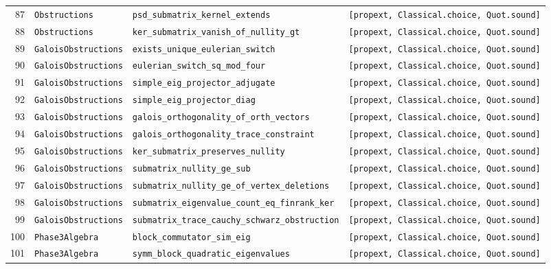 \documentclass[11pt,reqno]{amsart}
\theoremstyle{definition}
\theoremstyle{remark}
\numberwithin{equation}{section}
\numberwithin{table}{section}
\begin{document}
{\begin{longtable}{@{}r>{\raggedright\arraybackslash}p{1.2in}>{\raggedright\arraybackslash}p{2.55in}>{\raggedright\arraybackslash}p{1.85in}@{}}
87 & \nolinkurl{Obstructions} & \nolinkurl{psd_submatrix_kernel_extends} & \texttt{[propext, Classical.choice, Quot.sound]} \\
88 & \nolinkurl{Obstructions} & \nolinkurl{ker_submatrix_vanish_of_nullity_gt} & \texttt{[propext, Classical.choice, Quot.sound]} \\
89 & \nolinkurl{GaloisObstructions} & \nolinkurl{exists_unique_eulerian_switch} & \texttt{[propext, Classical.choice, Quot.sound]} \\
90 & \nolinkurl{GaloisObstructions} & \nolinkurl{eulerian_switch_sq_mod_four} & \texttt{[propext, Classical.choice, Quot.sound]} \\
91 & \nolinkurl{GaloisObstructions} & \nolinkurl{simple_eig_projector_adjugate} & \texttt{[propext, Classical.choice, Quot.sound]} \\
92 & \nolinkurl{GaloisObstructions} & \nolinkurl{simple_eig_projector_diag} & \texttt{[propext, Classical.choice, Quot.sound]} \\
93 & \nolinkurl{GaloisObstructions} & \nolinkurl{galois_orthogonality_of_orth_vectors} & \texttt{[propext, Classical.choice, Quot.sound]} \\
94 & \nolinkurl{GaloisObstructions} & \nolinkurl{galois_orthogonality_trace_constraint} & \texttt{[propext, Classical.choice, Quot.sound]} \\
95 & \nolinkurl{GaloisObstructions} & \nolinkurl{ker_submatrix_preserves_nullity} & \texttt{[propext, Classical.choice, Quot.sound]} \\
96 & \nolinkurl{GaloisObstructions} & \nolinkurl{submatrix_nullity_ge_sub} & \texttt{[propext, Classical.choice, Quot.sound]} \\
97 & \nolinkurl{GaloisObstructions} & \nolinkurl{submatrix_nullity_ge_of_vertex_deletions} & \texttt{[propext, Classical.choice, Quot.sound]} \\
98 & \nolinkurl{GaloisObstructions} & \nolinkurl{submatrix_eigenvalue_count_eq_finrank_ker} & \texttt{[propext, Classical.choice, Quot.sound]} \\
99 & \nolinkurl{GaloisObstructions} & \nolinkurl{submatrix_trace_cauchy_schwarz_obstruction} & \texttt{[propext, Classical.choice, Quot.sound]} \\
100 & \nolinkurl{Phase3Algebra} & \nolinkurl{block_commutator_sim_eig} & \texttt{[propext, Classical.choice, Quot.sound]} \\
101 & \nolinkurl{Phase3Algebra} & \nolinkurl{symm_block_quadratic_eigenvalues} & \texttt{[propext, Classical.choice, Quot.sound]} \\

\end{longtable}}
\end{document}
